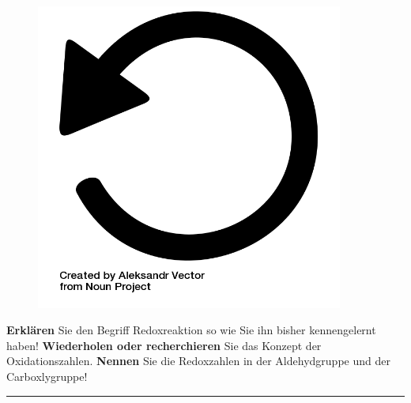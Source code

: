 \documentclass{scrartcl}  %
\begin{document}
\vspace{0.3cm}
		\begin{tcolorbox}[enhanced,
			colback=white,
			colframe=orange!60!red,
			fonttitle=\sffamily\bfseries\large, 
			title=Vorüberlegung,  %
			attach boxed title to top left={xshift=3.2mm,yshift=-0.50mm},
			boxed title style={skin=enhancedfirst jigsaw,size=small,arc=1mm,bottom=-1mm,colframe=orange!60!red,height=0.75cm},
			colbacktitle=orange!60!red,
			drop lifted shadow]	
			\begin{figure}  
				\centering
				\vspace{-14pt}  %
				\includegraphics[width=0.9\textwidth]{symbols/symbol_tex_review}
			\end{figure}
			
			\textbf{Erklären} Sie den Begriff Redoxreaktion so wie Sie ihn bisher kennengelernt haben! \newline
			\textbf{Wiederholen oder recherchieren} Sie das Konzept der Oxidationszahlen. \newline
			\textbf{Nennen} Sie die Redoxzahlen in der Aldehydgruppe und der Carboxlygruppe!
			
		\end{tcolorbox}
		\begin{center}
			\noindent\rule{18cm}{0.1pt}
		\end{center}
\end{document}
